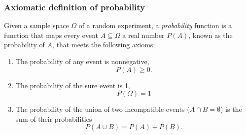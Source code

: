 \begin{frame}
\frametitle{Axiomatic definition of probability}
\begin{definition}
Given a sample space $\Omega$ of a random experiment, a \emph{probability} function is a function that maps
every event $A\subseteq \Omega$ a real number $P(A)$, known as the probability of $A$, that meets the following axioms:
\begin{enumerate}
\item The probability of any event is nonnegative, 
\[
P(A)\geq 0.
\]
\item The probability of the sure event is 1,
\[
P(\Omega)=1
\] 
\item The probability of the union of two incompatible events ($A\cap B=\emptyset$) is the sum of their probabilities
\[P(A\cup B) = P(A)+P(B).\]
\end{enumerate}
\end{definition}
\end{frame}


